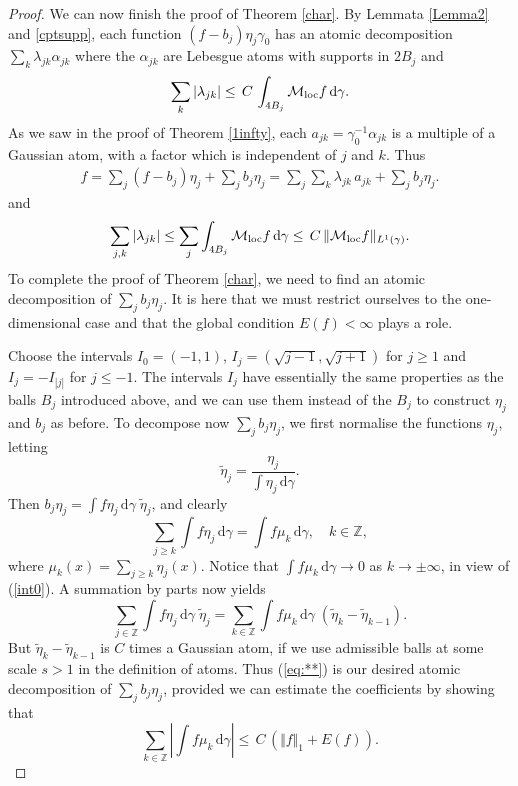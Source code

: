 \documentclass{amsart}                 %
\numberwithin{equation}{section}
\renewcommand\mod[1]{\left\vert{#1}\right\vert}
\newcommand\norm[2]{{\Vert{#1}\Vert_{#2}}}
\newcommand\wrt{\,\mathrm{d}}
\newcommand\1{{\bf 1}}
\newcommand\BZ{\mathbb{Z}}
\newcommand\cM{\mathcal{M}}  \newcommand\fM{\mathfrak{M}}
\newcommand\mlo {\cM_{\textnormal{loc}}}
\newcommand\ga{\gamma}    \newcommand\Ga{\Gamma}
\begin{document}
\begin{proof}
We can now finish the proof of Theorem \ref{char}. By Lemmata \ref{Lemma2} and \ref{cptsupp},  
each 
function $(f-b_j)\eta_j\gamma_0$ has an atomic decomposition $
\sum_k \lambda_{jk} \alpha_{jk}$ where the $\alpha_{jk}$ are Lebesgue atoms 
 with supports in $2B_j$ and
$$
\sum_k \mod{\lambda_{jk}}\le \,C\, \int_{4B_j} \mlo f \wrt\gamma.
$$
As we saw in the proof of Theorem \ref{1infty}, each  $a_{jk}=\gamma_0^{-1} \alpha_{jk}$ is a 
 multiple of a Gaussian atom, with a factor which is
 independent of $j$ and $k$. 
Thus
\begin{align}
f=\sum_j (f-b_j)\eta_j +\sum_j b_j \eta_j
= \sum_j \sum_k \lambda_{jk} \,a_{jk} +\sum_j b_j \eta_j. \label{aat} 
\end{align}
and
$$
\sum_{j,k} \mod{\lambda_{jk}}\le \sum_j \int_{4B_j}\mlo f \wrt\gamma
\le \,C\, \norm{\mlo f}{L^1(\gamma)}.
$$
To complete the proof of Theorem \ref{char}, we  need to find an 
atomic decomposition of $\sum_j b_j\eta_j$. It is here that we must 
restrict ourselves to the one-dimensional case and that the global condition $E(f)
<\infty$ plays a role. \par
Choose the intervals $I_0=(-1,1)$, $I_j=(\sqrt{j-1},
\sqrt{j+1})$ for $j\ge 1$ and $I_j=-I_{\mod{j}}$ for $j\le -1$.  The intervals $I_j$ 
have essentially the same properties as the balls $B_j$ introduced above, and we 
can use them instead of the $B_j$ to construct $\eta_j$ and $b_j$ as before. 
To decompose now $\sum_j b_j\eta_j$,
we first normalise the functions $\eta_j$, letting
\[
\tilde{\eta}_j = \frac{\eta_j}{\int \eta_j \wrt \ga}.
\]
Then
 $b_j\eta_j = \int f \eta_j \wrt \ga \; \tilde{\eta}_j$, and clearly
\[
\sum_{j\ge k}\int f \eta_j \wrt \ga = \int f \mu_k \wrt \ga, \quad k \in \BZ,
\]
where
$\mu_k(x) = \sum_{j\ge k} \eta_j(x).$ Notice that $\int f \mu_k \wrt \ga
\to 0$ as $k \to \pm \infty$, in view of (\ref{int0}). A summation by parts now yields
\begin{equation}
  \label{eq:**}
  \sum_{j\in \BZ} \int f \eta_j \wrt \ga \; \tilde{\eta}_j
=  \sum_{k\in \BZ} \int f \mu_k \wrt \ga \; (\tilde{\eta}_k - \tilde{\eta}_{k-1}).
\end{equation}
But $\tilde{\eta}_k - \tilde{\eta}_{k-1}$ is $C$ times a Gaussian
 atom, if we use
admissible balls at some scale $s>1$ in the definition of atoms. Thus
(\ref{eq:**}) is our desired atomic decomposition of  $\sum_j b_j\eta_j$,
provided we can estimate the coefficients by showing that
\begin{equation}\label{estmuj}
 \sum_{k\in \BZ}\left| \int f \mu_k \wrt \ga \right|
\le\,C\,\left(\norm{f}{1}+ E(f)\right).

\end{equation}
\end{proof}
\end{document}
